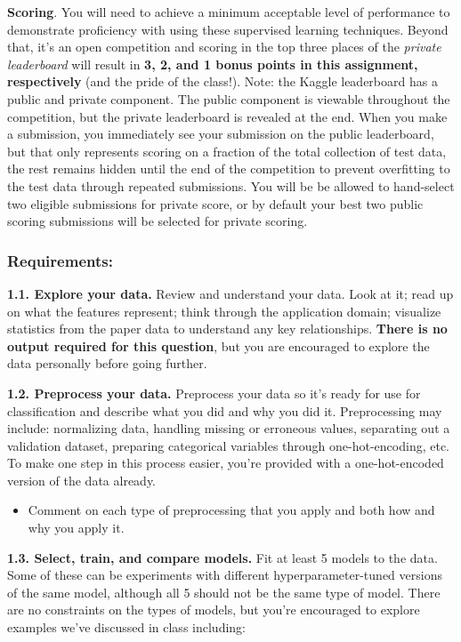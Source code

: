 \documentclass[
  letterpaper,
  DIV=11,
  numbers=noendperiod]{scrartcl}
\providecommand{\tightlist}{%
  \setlength{\itemsep}{0pt}\setlength{\parskip}{0pt}}\usepackage{longtable,booktabs,array}
\begin{document}
\textbf{Scoring}. You will need to achieve a minimum acceptable level of
performance to demonstrate proficiency with using these supervised
learning techniques. Beyond that, it's an open competition and scoring
in the top three places of the \emph{private leaderboard} will result in
\textbf{3, 2, and 1 bonus points in this assignment, respectively} (and
the pride of the class!). Note: the Kaggle leaderboard has a public and
private component. The public component is viewable throughout the
competition, but the private leaderboard is revealed at the end. When
you make a submission, you immediately see your submission on the public
leaderboard, but that only represents scoring on a fraction of the total
collection of test data, the rest remains hidden until the end of the
competition to prevent overfitting to the test data through repeated
submissions. You will be be allowed to hand-select two eligible
submissions for private score, or by default your best two public
scoring submissions will be selected for private scoring.

\subsubsection{Requirements:}\label{requirements}

\textbf{1.1. Explore your data.} Review and understand your data. Look
at it; read up on what the features represent; think through the
application domain; visualize statistics from the paper data to
understand any key relationships. \textbf{There is no output required
for this question}, but you are encouraged to explore the data
personally before going further.

\textbf{1.2. Preprocess your data.} Preprocess your data so it's ready
for use for classification and describe what you did and why you did it.
Preprocessing may include: normalizing data, handling missing or
erroneous values, separating out a validation dataset, preparing
categorical variables through one-hot-encoding, etc. To make one step in
this process easier, you're provided with a one-hot-encoded version of
the data already.

\begin{itemize}
\tightlist
\item
  Comment on each type of preprocessing that you apply and both how and
  why you apply it.
\end{itemize}

\textbf{1.3. Select, train, and compare models.} Fit at least 5 models
to the data. Some of these can be experiments with different
hyperparameter-tuned versions of the same model, although all 5 should
not be the same type of model. There are no constraints on the types of
models, but you're encouraged to explore examples we've discussed in
class including:
\end{document}
